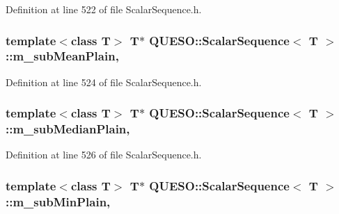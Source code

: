 Definition at line 522 of file Scalar\-Sequence.\-h.

\hypertarget{class_q_u_e_s_o_1_1_scalar_sequence_a2e4e2bb4fb0a4ea3d10498601345d4fb}{
\subsubsection[{m\-\_\-sub\-Mean\-Plain}]{\setlength{\rightskip}{0pt plus 5cm}template$<$class T$>$ T$\ast$ {\bf Q\-U\-E\-S\-O\-::\-Scalar\-Sequence}$<$ T $>$\-::m\-\_\-sub\-Mean\-Plain\hspace{0.3cm}{\ttfamily [mutable]}, {\ttfamily [private]}}}\label{class_q_u_e_s_o_1_1_scalar_sequence_a2e4e2bb4fb0a4ea3d10498601345d4fb}


Definition at line 524 of file Scalar\-Sequence.\-h.

\hypertarget{class_q_u_e_s_o_1_1_scalar_sequence_a7f9efb259fff49756428a925a80fadad}{
\subsubsection[{m\-\_\-sub\-Median\-Plain}]{\setlength{\rightskip}{0pt plus 5cm}template$<$class T$>$ T$\ast$ {\bf Q\-U\-E\-S\-O\-::\-Scalar\-Sequence}$<$ T $>$\-::m\-\_\-sub\-Median\-Plain\hspace{0.3cm}{\ttfamily [mutable]}, {\ttfamily [private]}}}\label{class_q_u_e_s_o_1_1_scalar_sequence_a7f9efb259fff49756428a925a80fadad}


Definition at line 526 of file Scalar\-Sequence.\-h.

\hypertarget{class_q_u_e_s_o_1_1_scalar_sequence_a3e85805e8fe276feccc90faf652e6b18}{
\subsubsection[{m\-\_\-sub\-Min\-Plain}]{\setlength{\rightskip}{0pt plus 5cm}template$<$class T$>$ T$\ast$ {\bf Q\-U\-E\-S\-O\-::\-Scalar\-Sequence}$<$ T $>$\-::m\-\_\-sub\-Min\-Plain\hspace{0.3cm}{\ttfamily [mutable]}, {\ttfamily [private]}}}\label{class_q_u_e_s_o_1_1_scalar_sequence_a3e85805e8fe276feccc90faf652e6b18}



